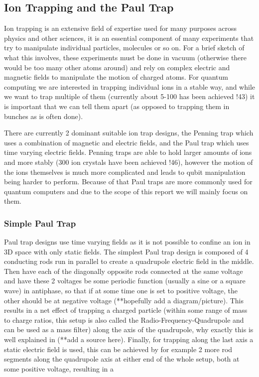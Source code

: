 \begin{itemize}
\subsection{Ion Trapping and the Paul Trap}
Ion trapping is an extensive field of expertise used for many purposes across physics and other sciences, it is an essential component of many experiments that try to manipulate individual particles, molecules or so on.
For a brief sketch of what this involves, these experiments must be done in vacuum (otherwise there would be too many other atoms around) and rely on complex electric and magnetic fields to manipulate the motion of charged atoms.
For quantum computing we are interested in trapping individual ions in a stable way, and while we want to trap multiple of them (currently about 5-100 has been achieved !43) it is important that we can tell them apart (as opposed to trapping them in bunches as is often done).

There are currently 2 dominant suitable ion trap designs, the Penning trap which uses a combination of magnetic and electric fields, and the Paul trap which uses time varying electric fields.
Penning traps are able to hold larger amounts of ions and more stably (300 ion crystals have been achieved !46), however the motion of the ions themselves is much more complicated and leads to qubit manipulation being harder to perform.
Because of that Paul traps are more commonly used for quantum computers and due to the scope of this report we will mainly focus on them.

\subsubsection{Simple Paul Trap}
Paul trap designs use time varying fields as it is not possible to confine an ion in 3D space with only static fields.
The simplest Paul trap design is composed of 4 conducting rods run in parallel to create a quadrupole electric field in the middle.
Then have each of the diagonally opposite rods connected at the same voltage and have these 2 voltages be some periodic function (usually a sine or a square wave) in antiphase, so that if at some time one is set to positive voltage, the other should be at negative voltage (**hopefully add a diagram/picture).
This results in a net effect of trapping a charged particle (within some range of mass to charge ratios, this setup is also called the Radio-Frequency-Quadrupole and can be used as a mass filter) along the axis of the quadrupole, why exactly this is well explained in (**add a source here).
Finally, for trapping along the last axis a static electric field is used, this can be achieved by for example 2 more rod segments along the quadrupole axis at either end of the whole setup, both at some positive voltage, resulting in a 



\end{itemize}
